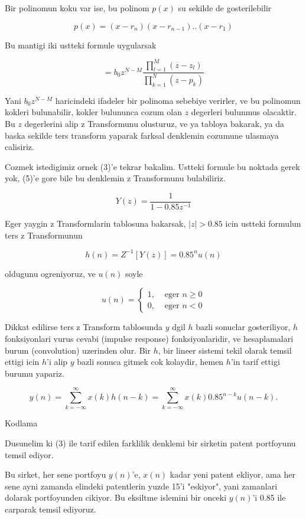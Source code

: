 \documentclass[12pt,fleqn]{article}\usepackage{../common}
\begin{document}
Bir polinomun koku var ise, bu polinom $p(x)$ su sekilde de gosterilebilir

$$ p(x) = (x-r_n)(x-r_{n-1})..(x-r_1) $$

Bu mantigi iki ustteki formule uygularsak 

$$ = b_0 z^{N - M} 
\frac{\prod_{l=1}^{M}(z-z_l)}{ \prod_{k=1}^{N}(z-p_k) }
$$

Yani $b_0z^{N-M}$ haricindeki ifadeler bir polinoma sebebiye verirler, ve
bu polinomun kokleri bulunabilir, kokler bulununca cozum olan $z$ degerleri
bulunmus olacaktir. Bu $z$ degerlerini alip z Transformunu olusturuz, ve ya
tabloya bakarak, ya da baska sekilde ters transform yaparak farksal
denklemin cozumune ulasmaya calisiriz. 

Cozmek istedigimiz ornek (3)'e tekrar bakalim. Ustteki formule bu noktada
gerek yok, (5)'e gore bile bu denklemin z Transformunu bulabiliriz. 

$$ Y(z) = \frac{1}{1-0.85z^{-1}} $$

Eger yaygin z Transformlarin tablosuna bakarsak, $|z|>0.85$ icin ustteki
formulun ters z Transformunun 

$$ h(n) = Z^{-1} [Y(z)] = 0.85^nu(n) $$

oldugunu ogreniyoruz, ve $u(n)$ soyle 

$$
u(n) = 
\begin{cases}
1, & \textrm{ eger } n \ge 0 \\ 
0, & \textrm{ eger } n < 0
\end{cases} 
 $$

Dikkat edilirse ters z Transform tablosunda $y$ dgil $h$ bazli sonuclar
gosteriliyor, $h$ fonksiyonlari vurus cevabi (impulse response)
fonksiyonlaridir, ve hesaplamalari burum (convolution) uzerinden olur. Bir
$h$, bir lineer sistemi tekil olarak temsil ettigi icin $h$'i alip $y$
bazli sonuca gitmek cok kolaydir, hemen $h$'in tarif ettigi burumu
yapariz. 

$$ y(n) = \sum_{k=-\infty}^\infty x(k) h(n-k) = \sum_{k=-\infty}^\infty x(k) 0.85^{n-k} u(n-k). $$ 

Kodlama

Dusunelim ki (3) ile tarif edilen farklilik denklemi bir sirketin patent
portfoyunu temsil ediyor. 

Bu sirket, her sene portfoyu $y(n)$'e, $x(n)$ kadar yeni patent ekliyor,
ama her sene ayni zamanda elindeki patentlerin yuzde 15'i "eskiyor", yani
zamanlari dolarak portfoyunden cikiyor. Bu eksiltme islemini bir onceki
$y(n)$'i 0.85 ile carparak temsil ediyoruz. 
\end{document}
